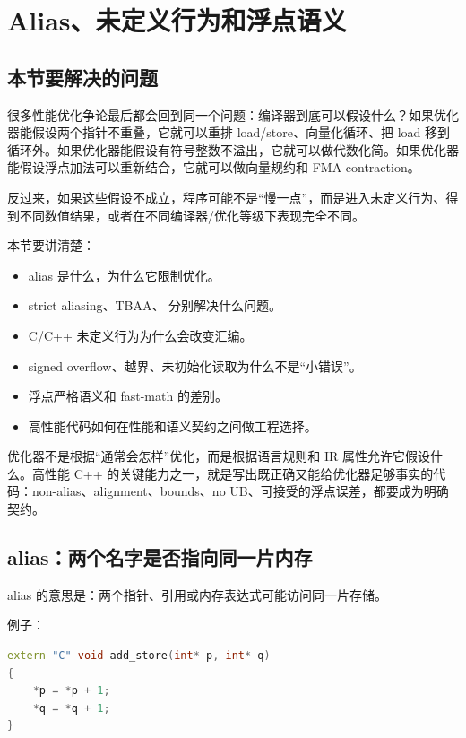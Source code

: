 \section{Alias、未定义行为和浮点语义}

\subsection{本节要解决的问题}

很多性能优化争论最后都会回到同一个问题：编译器到底可以假设什么？如果优化器能假设两个指针不重叠，它就可以重排 load/store、向量化循环、把 load 移到循环外。如果优化器能假设有符号整数不溢出，它就可以做代数化简。如果优化器能假设浮点加法可以重新结合，它就可以做向量规约和 FMA contraction。

反过来，如果这些假设不成立，程序可能不是“慢一点”，而是进入未定义行为、得到不同数值结果，或者在不同编译器/优化等级下表现完全不同。

本节要讲清楚：

\begin{itemize}
  \item alias 是什么，为什么它限制优化。
  \item strict aliasing、TBAA、 分别解决什么问题。
  \item C/C++ 未定义行为为什么会改变汇编。
  \item signed overflow、越界、未初始化读取为什么不是“小错误”。
  \item 浮点严格语义和 fast-math 的差别。
  \item 高性能代码如何在性能和语义契约之间做工程选择。
\end{itemize}

\begin{keyidea}
优化器不是根据“通常会怎样”优化，而是根据语言规则和 IR 属性允许它假设什么。高性能 C++ 的关键能力之一，就是写出既正确又能给优化器足够事实的代码：non-alias、alignment、bounds、no UB、可接受的浮点误差，都要成为明确契约。
\end{keyidea}

\subsection{alias：两个名字是否指向同一片内存}

alias 的意思是：两个指针、引用或内存表达式可能访问同一片存储。

例子：

\begin{lstlisting}[language=C++]
extern "C" void add_store(int* p, int* q)
{
    *p = *p + 1;
    *q = *q + 1;
}
\end{lstlisting}

